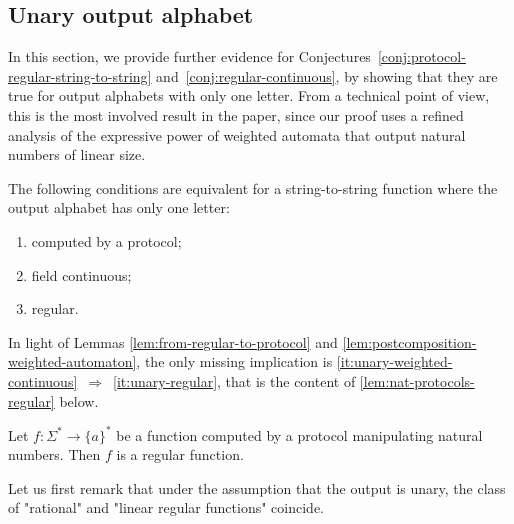 \subsection{Unary output alphabet}
\label{sec:unary-output-alphabet}

In this section, we provide further evidence for
Conjectures~\ref{conj:protocol-regular-string-to-string}
and~\ref{conj:regular-continuous}, by showing that they are true for output
alphabets with only one letter. From a technical point of view, this is the
most involved result in the paper, since our proof uses a refined analysis of
the expressive power of weighted automata that output natural numbers of linear
size.

\begin{theorem}\label{thm:unary-string-to-string}
    The following conditions are equivalent for  a string-to-string function where  the output alphabet  has only one letter:
    \begin{enumerate}
        \item computed by a protocol;
        \item \label{it:unary-weighted-continuous} field continuous;
        \item \label{it:unary-regular} regular.
    \end{enumerate}
\end{theorem}

In light of Lemmas \ref{lem:from-regular-to-protocol} and
\ref{lem:postcomposition-weighted-automaton}, the only missing implication is
\ref{it:unary-weighted-continuous}~$\Rightarrow$~\ref{it:unary-regular},
that is the content of \cref{lem:nat-protocols-regular} below.


\begin{lemma}
  \label{lem:nat-protocols-regular}
  Let $f : \Sigma^* \to \{a\}^*$ be a function computed by a protocol
  manipulating natural numbers. Then $f$ is a regular function.
\end{lemma}

Let us first remark that under the assumption that the output is unary,
the class of "rational" and "linear regular functions" coincide.

